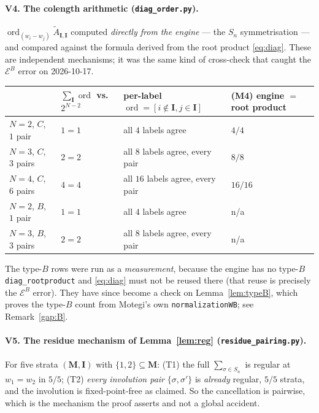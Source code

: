 \documentclass[11pt]{article}
\theoremstyle{plain}
\theoremstyle{definition}
\theoremstyle{remark}
\theoremstyle{plain}
\newcommand{\bI}{\mathbf{I}}
\newcommand{\bM}{\mathbf{M}}
\newcommand{\At}{\widetilde{A}}
\newcommand{\ord}{\operatorname{ord}}
\begin{document}
\paragraph{V4. The colength arithmetic (\texttt{diag\_order.py}).}
$\ord_{(w_i-w_j)}\At_{\bI,\bI}$ computed \emph{directly from the engine} --- the
$S_n$ symmetrisation --- and compared against the formula derived from the root
product \eqref{eq:diag}.  These are independent mechanisms; it was the same kind
of cross-check that caught the $\mathcal{E}^B$ error on 2026-10-17.
\begin{center}\small
\begin{tabular}{llll}
\toprule
 & $\sum_\bI\ord$ vs.\ $2^{N-2}$ & per-label $\ord=[i\notin\bI,j\in\bI]$ & (M4) engine $=$ root product \\\midrule
$N=2$, $C$, $1$ pair  & $1=1$ & all $4$ labels agree & $4/4$ \\
$N=3$, $C$, $3$ pairs & $2=2$ & all $8$ labels agree, every pair & $8/8$ \\
$N=4$, $C$, $6$ pairs & $4=4$ & all $16$ labels agree, every pair & $16/16$ \\
$N=2$, $B$, $1$ pair  & $1=1$ & all $4$ labels agree & n/a \\
$N=3$, $B$, $3$ pairs & $2=2$ & all $8$ labels agree, every pair & n/a \\
\bottomrule
\end{tabular}
\end{center}
The type-$B$ rows were run as a \emph{measurement}, because the engine has no
type-$B$ \texttt{diag\_rootproduct} and \eqref{eq:diag} must not be reused there
(that reuse is precisely the $\mathcal{E}^B$ error).  They have since become a
check on Lemma~\ref{lem:typeB}, which proves the type-$B$ count from Motegi's own
\texttt{normalizationWB}; see Remark~\ref{gap:B}.

\paragraph{V5. The residue mechanism of Lemma~\ref{lem:reg}
(\texttt{residue\_pairing.py}).}
For five strata $(\bM,\bI)$ with $\{1,2\}\subseteq\bM$: (T1) the full
$\sum_{\sigma\in S_n}$ is regular at $w_1=w_2$ in $5/5$; (T2) \emph{every
involution pair} $\{\sigma,\sigma'\}$ is \emph{already} regular, $5/5$ strata,
and the involution is fixed-point-free as claimed.  So the cancellation is
pairwise, which is the mechanism the proof asserts and not a global accident.
\end{document}
